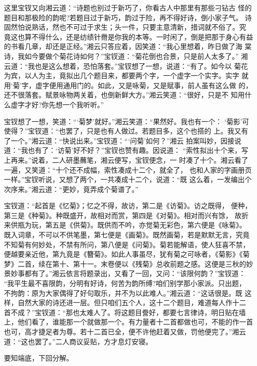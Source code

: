 这里宝钗又向湘云道：“诗题也别过于新巧了，你看古人中那里有那些刁钻古
怪的题目和那极险的韵呢?若题目过于新巧，韵过于险，再不得好诗，倒小家子气。
诗固然怕说熟话，然也不可过于求生；头一件，只要主意清新，措词就不俗了。究
竟这也算不得什么，还是纺绩针黹是你我的本等。一时闲了，倒是把那于身心有益
的书看几章，却还是正经。”湘云只答应着，因笑道：“我心里想着，昨日做了海
棠诗，我如今要做个菊花诗如何？”宝钗道：“菊花倒也合景，只是前人太多了。”
湘云道：“我也是这么想着，恐怕落套。”宝钗想了一想，说道：“有了。如今以
菊花为宾，以人为主，竟拟出几个题目来，都要两个字，一个虚字一个实字。实字
就用‘菊’字，虚字便用通用门的。如此，又是咏菊，又是赋事，前人虽有这么做
的，还不很落套。赋景咏物两关着，也倒新鲜大方。”湘云笑道：“很好，只是不
知用什么虚字才好?你先想一个我听听。”

宝钗想了一想，笑道：“‘菊梦’就好。”湘云笑道：“果然好。我也有一个：
‘菊影’可使得？”宝钗道：“也罢了，只是也有人做过。若题目多，这个也搭的
上。我又有了一个。”湘云道：“快说出来。”宝钗道：“‘问菊’如何？”湘云
拍案叫妙，因接说道：“我也有了：‘访菊’好不好？”宝钗也赞有趣。因说道：
“索性拟出十个来，写上再来。”说着，二人研墨蘸笔，湘云便写，宝钗便念，一
时凑了十个。湘云看了一遍，又笑道：“十个还不成幅，索性凑成十二个，就全了，
也和人家的字画册页一样。”宝钗听说，又想了两个，一共凑成十二个，说道：“既
这么着，一发编出个次序来。”湘云道：“更妙，竟弄成个菊谱了。”

宝钗道：“起首是《忆菊》；忆之不得，故访，第二是《访菊》。访之既得，
便种，第三是《种菊》。种既盛开，故相对而赏，第四是《对菊》。相对而兴有馀，
故折来供瓶为玩，第五是《供菊》。既供而不吟，亦觉菊无彩色，第六便是《咏菊》。
既入词章，不可以不供笔墨，第七便是《画菊》。既然画菊，若是默默无言，究竟
不知菊有何妙处，不禁有所问，第八便是《问菊》。菊若能解语，使人狂喜不禁，
便越要亲近他，第九竟是《簪菊》。如此人事虽尽，犹有菊之可咏者，《菊影》《菊
梦》二首，续在第十、第十一。末卷便以《残菊》总收前题之感。这便是三秋的妙
景妙事都有了。”湘云依言将题录出，又看了一回，又问：“该限何韵？”宝钗道：
“我平生最不喜限韵，分明有好诗，何苦为韵所缚?咱们别学那小家派。只出题，
不拘韵：原为大家偶得了好句取乐，并不为以此难人。”湘云道：“这话很是。既
这样，自然大家的诗还进一层。但只咱们五个人，这十二个题目，难道每人作十二
首不成？”宝钗道：“那也太难人了。将这题目誊好，都要七言律诗，明日贴在墙
上，他们看了，谁能那一个就做那一个。有力量者十二首都做也可，不能的作一首
也可，高才捷足者为尊。若十二首已全，便不许他赶着又做，罚他便完了。”湘云
道：“这也罢了。”二人商议妥贴，方才息灯安寝。

要知端底，下回分解。